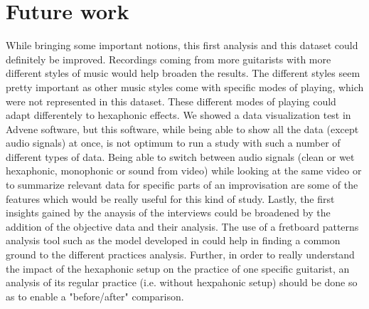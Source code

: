 \documentclass{article}
\begin{document}
\section{Future work}\label{sec:future_work}

While bringing some important notions, this first analysis and this dataset could definitely be improved. Recordings coming from more guitarists with more different styles of music would help broaden the results. The different styles seem pretty important as other music styles come with specific modes of playing, which were not represented in this dataset. These different modes of playing could adapt differentely to hexaphonic effects.
We showed a data visualization test in Advene software, but this software, while being able to show all the data (except audio signals) at once, is not optimum to run a study with such a number of different types of data.  Being able to switch between audio signals (clean or wet hexaphonic, monophonic or sound from video) while looking at the same video or to summarize relevant data for specific parts of an improvisation are some of the features which would be really useful for this kind of study.
Lastly, the first insights gained by the anaysis of the interviews could be broadened by the addition of the objective data and their analysis. The use of a fretboard patterns analysis tool such as the model developed in \cite{musico:deSouza2018_fretboard} could help in finding a common ground to the different practices analysis. Further, in order to really understand the impact of the hexaphonic setup on the practice of one specific guitarist, an analysis of its regular practice (i.e. without hexpahonic setup) should be done so as to enable a "before/after" comparison.
\end{document}
